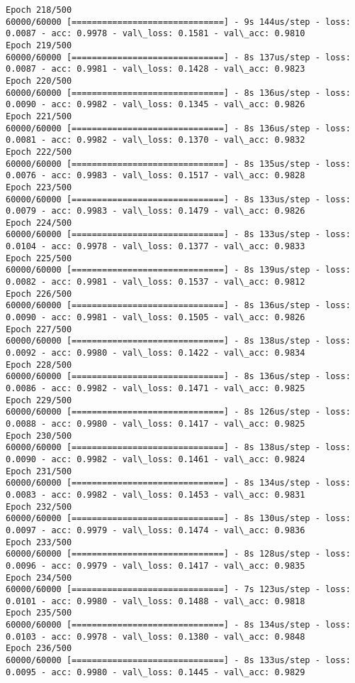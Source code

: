 \documentclass[11pt]{article}
\begin{document}
\begin{Verbatim}[commandchars=\\\{\}]
Epoch 218/500
60000/60000 [==============================] - 9s 144us/step - loss: 0.0087 - acc: 0.9978 - val\_loss: 0.1581 - val\_acc: 0.9810
Epoch 219/500
60000/60000 [==============================] - 8s 137us/step - loss: 0.0087 - acc: 0.9981 - val\_loss: 0.1428 - val\_acc: 0.9823
Epoch 220/500
60000/60000 [==============================] - 8s 136us/step - loss: 0.0090 - acc: 0.9982 - val\_loss: 0.1345 - val\_acc: 0.9826
Epoch 221/500
60000/60000 [==============================] - 8s 136us/step - loss: 0.0081 - acc: 0.9982 - val\_loss: 0.1370 - val\_acc: 0.9832
Epoch 222/500
60000/60000 [==============================] - 8s 135us/step - loss: 0.0076 - acc: 0.9983 - val\_loss: 0.1517 - val\_acc: 0.9828
Epoch 223/500
60000/60000 [==============================] - 8s 133us/step - loss: 0.0079 - acc: 0.9983 - val\_loss: 0.1479 - val\_acc: 0.9826
Epoch 224/500
60000/60000 [==============================] - 8s 133us/step - loss: 0.0104 - acc: 0.9978 - val\_loss: 0.1377 - val\_acc: 0.9833
Epoch 225/500
60000/60000 [==============================] - 8s 139us/step - loss: 0.0082 - acc: 0.9981 - val\_loss: 0.1537 - val\_acc: 0.9812
Epoch 226/500
60000/60000 [==============================] - 8s 136us/step - loss: 0.0090 - acc: 0.9981 - val\_loss: 0.1505 - val\_acc: 0.9826
Epoch 227/500
60000/60000 [==============================] - 8s 138us/step - loss: 0.0092 - acc: 0.9980 - val\_loss: 0.1422 - val\_acc: 0.9834
Epoch 228/500
60000/60000 [==============================] - 8s 136us/step - loss: 0.0086 - acc: 0.9982 - val\_loss: 0.1471 - val\_acc: 0.9825
Epoch 229/500
60000/60000 [==============================] - 8s 126us/step - loss: 0.0088 - acc: 0.9980 - val\_loss: 0.1417 - val\_acc: 0.9825
Epoch 230/500
60000/60000 [==============================] - 8s 138us/step - loss: 0.0090 - acc: 0.9982 - val\_loss: 0.1461 - val\_acc: 0.9824
Epoch 231/500
60000/60000 [==============================] - 8s 134us/step - loss: 0.0083 - acc: 0.9982 - val\_loss: 0.1453 - val\_acc: 0.9831
Epoch 232/500
60000/60000 [==============================] - 8s 130us/step - loss: 0.0097 - acc: 0.9979 - val\_loss: 0.1474 - val\_acc: 0.9836
Epoch 233/500
60000/60000 [==============================] - 8s 128us/step - loss: 0.0096 - acc: 0.9979 - val\_loss: 0.1417 - val\_acc: 0.9835
Epoch 234/500
60000/60000 [==============================] - 7s 123us/step - loss: 0.0101 - acc: 0.9980 - val\_loss: 0.1488 - val\_acc: 0.9818
Epoch 235/500
60000/60000 [==============================] - 8s 134us/step - loss: 0.0103 - acc: 0.9978 - val\_loss: 0.1380 - val\_acc: 0.9848
Epoch 236/500
60000/60000 [==============================] - 8s 133us/step - loss: 0.0095 - acc: 0.9980 - val\_loss: 0.1445 - val\_acc: 0.9829

\end{Verbatim}
\end{document}
